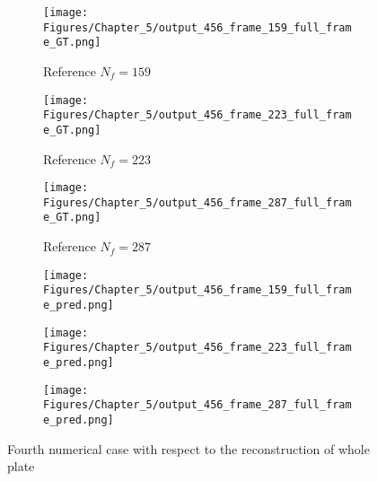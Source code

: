 \begin{figure} [!ht]
	\centering
	\begin{subfigure}[b]{.32\textwidth}
		\centering
		\texttt{[image: Figures/Chapter\_5/output\_456\_frame\_159\_full\_frame\_GT.png]}
		\caption{Reference $N_f=159$}
		\label{fig:ref_456_full_159}
	\end{subfigure}
	\begin{subfigure}[b]{.32\textwidth}
		\centering
		\texttt{[image: Figures/Chapter\_5/output\_456\_frame\_223\_full\_frame\_GT.png]}
		\caption{Reference $N_f=223$}
		\label{fig:ref_456_full_223}
	\end{subfigure}
	\begin{subfigure}[b]{.32\textwidth}
		\centering
		\texttt{[image: Figures/Chapter\_5/output\_456\_frame\_287\_full\_frame\_GT.png]}
		\caption{Reference $N_f=287$}
		\label{fig:ref_456_full_287}	
	\end{subfigure}
	\begin{subfigure}[b]{.32\textwidth}
		\centering
		\texttt{[image: Figures/Chapter\_5/output\_456\_frame\_159\_full\_frame\_pred.png]}
		\caption{}
		\label{fig:pred_456_full_159}
	\end{subfigure}
	\begin{subfigure}[b]{.32\textwidth}
		\centering
		\texttt{[image: Figures/Chapter\_5/output\_456\_frame\_223\_full\_frame\_pred.png]}
		\caption{}
		\label{fig:pred_456_full_223}
	\end{subfigure}
	\begin{subfigure}[b]{.32\textwidth}
		\centering
		\texttt{[image: Figures/Chapter\_5/output\_456\_frame\_287\_full\_frame\_pred.png]}
		\caption{}
		\label{fig:pred_456_full_287}	
	\end{subfigure}
	\caption{Fourth numerical case with respect to the reconstruction of whole plate}
	\label{fig:num_results_CS_456}
\end{figure}

